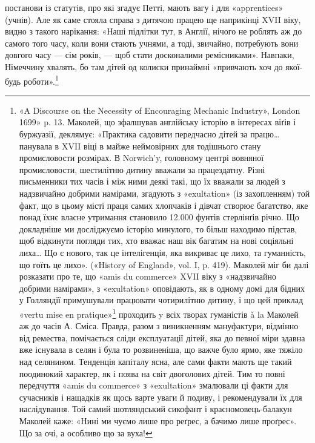\parcont{}  %
постанови із статутів, про які згадує Петті, мають вагу і для
«apprentices» (учнів). Але як саме стояла справа з дитячою працею
ще наприкінці XVII віку, видно з такого нарікання: «Наші
підлітки тут, в Англії, нічого не роблять аж до самого того часу,
коли вони стають учнями, а тоді, звичайно, потребують вони довгого
часу — сім років, — щоб стати досконалими ремісниками».
Навпаки, Німеччину хвалять, бо там дітей од колиски принаймні
«привчають хоч до якої-будь роботи».\footnote{
«A Discourse on the Necessity of Encouraging Mechanic Industry»,
London 1699» p. 13. Маколей, що зфалшував англійську історію в інтересах
віґів і буржуазії, деклямує: «Практика садовити передчасно
дітей за працю\dots{} панувала в XVII віці в майже неймовірних для тодішнього
стану промисловости розмірах. В Norwich’y, головному центрі
вовняної промисловости, шестилітню дитину вважали за працездатну.
Різні письменники тих часів і між ними деякі такі, що їх вважали за людей
з надзвичайно добрими намірами, згадують з «exultation» (із захопленням)
той факт, що в цьому місті праця самих хлопчаків і дівчат створює
багатство, яке понад їхнє власне утримання становило 12.000 фунтів
стерлінґів річно. Що докладніше ми досліджуємо історію минулого, то
більш находимо підстав, щоб відкинути погляди тих, хто вважає наш
вік багатим на нові соціяльні лиха\dots{} Що є нового, так це інтелігенція,
яка викриває це лихо, та гуманність, що гоїть це лихо». («History of
England», vol. I, p. 419). Маколей міг би далі розказати про те, що «amis
du commerce» XVII віку з «надзвичайно добрими намірами», з «exultation»
оповідають, як в одному домі для бідних у Голляндії примушували
працювати чотирилітню дитину, і що цей приклад «vertu mise en pratique»\footnote*{
— практичної чесноти. \emph{Ред.}
}
проходить y всіх творах гуманістів à la Маколей аж до часів
А. Сміса. Правда, разом з виникненням мануфактури, відмінно від ремества,
помічається сліди експлуатації дітей, яка до певної міри здавна
вже існувала в селян і була то розвиненіша, що важче було ярмо,
яке тяжіло над селянином. Тенденція капіталу ясна, але сами факти
мають ще такий поодинокий характер, як і поява на світ двоголових
дітей. Тим то повні передчуття «amis du commerce» з «exultation» змалювали
ці факти для сучасників і нащадків як щось варте уваги й подиву,
і рекомендували їх для наслідування. Той самий шотляндський сикофант
і красномовець-балакун Маколей каже: «Нині ми чуємо лише про реґрес,
а бачимо лише проґрес». Що за очі, а особливо що за вуха!
}


